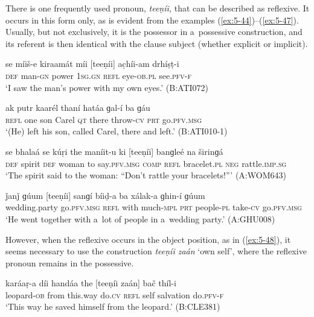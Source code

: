 There is one frequently used pronoun, \textit{teeṇíi,} that can be described as reflexive. It
occurs in this form only, as is evident from the examples (\ref{ex:5-44})--(\ref{ex:5-47}). Usually, but not
exclusively, it is the possessor in a~possessive construction, and its referent is then identical
with the clause subject (whether explicit or implicit).

\begin{exe}
\ex
\label{ex:5-44}
\gll se míiš-e kiraamát míi [teeṇíi] ac̣híi-am drhíṣṭ-i\\
\textsc{def} man-\textsc{gn} power \textsc{1sg.gn} \textsc{refl} eye-\textsc{ob.pl} see.\textsc{pfv-f}\\
\glt `I saw the man's power with my own eyes.' (B:ATI072)

\ex
\label{ex:5-45}
\gll [teeṇíi] ak putr kaarél thaní hatáa ɡal-í ba ɡáu \\
\textsc{refl} one son Carel \textsc{qt} there throw-\textsc{cv} \textsc{prt} go.\textsc{pfv.msg}\\
\glt `(He) left his son, called Carel, there and left.' (B:ATI010-1)

\ex
\label{ex:5-46}
\gll se bhalaá se kúṛi the maníit-u ki [teeṇíi] banɡleé na širinɡá\\
\textsc{def} spirit \textsc{def} woman to say.\textsc{pfv.msg} \textsc{comp} \textsc{refl} bracelet.\textsc{pl} \textsc{neg} rattle.\textsc{imp.sg}\\
\glt `The spirit said to the woman: ``Don't rattle your bracelets!''' (A:WOM643)

\ex
\label{ex:5-47}
\gll ǰanǰ ɡúum [teeṇíi] sanɡí bíiḍ-a ba xálak-a ɡhin-í ɡúum\\
wedding.party go.\textsc{pfv.msg } \textsc{refl} with much-\textsc{mpl} \textsc{prt} people-\textsc{pl} take-\textsc{cv} go.\textsc{pfv.msg}\\
\glt `He went together with a~lot of people in a~wedding party.' (A:GHU008)
\end{exe}
However, when the reflexive occurs in the object position, as in (\ref{ex:5-48}), it seems necessary to use the construction \textit{teeṇíi zaán} `own self', where the reflexive pronoun remains in the possessive.
\begin{exe}
\ex
\label{ex:5-48}
\gll karáaṛ-a díi handáa the [teeṇíi zaán] bač thíl-i\\
leopard-\textsc{ob} from this.way do.\textsc{cv} \textsc{refl} self salvation do.\textsc{pfv-f}\\
\glt `This way he saved himself from the leopard.' (B:CLE381)
\end{exe}

